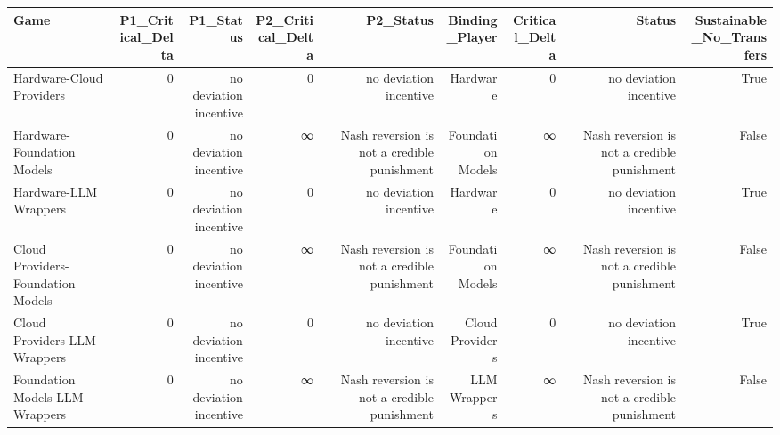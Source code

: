 

\begin{tabular}{@{}lrrrrrrrr@{}}
\toprule
Game & P1\_Critical\_Delta & P1\_Status & P2\_Critical\_Delta & P2\_Status & Binding\_Player & Critical\_Delta & Status & Sustainable\_No\_Transfers \\
\midrule
Hardware-Cloud Providers & 0 & no deviation incentive & 0 & no deviation incentive & Hardware & 0 & no deviation incentive & True \\
Hardware-Foundation Models & 0 & no deviation incentive & ∞ & Nash reversion is not a credible punishment & Foundation Models & ∞ & Nash reversion is not a credible punishment & False \\
Hardware-LLM Wrappers & 0 & no deviation incentive & 0 & no deviation incentive & Hardware & 0 & no deviation incentive & True \\
Cloud Providers-Foundation Models & 0 & no deviation incentive & ∞ & Nash reversion is not a credible punishment & Foundation Models & ∞ & Nash reversion is not a credible punishment & False \\
Cloud Providers-LLM Wrappers & 0 & no deviation incentive & 0 & no deviation incentive & Cloud Providers & 0 & no deviation incentive & True \\
Foundation Models-LLM Wrappers & 0 & no deviation incentive & ∞ & Nash reversion is not a credible punishment & LLM Wrappers & ∞ & Nash reversion is not a credible punishment & False \\
\bottomrule
\end{tabular}